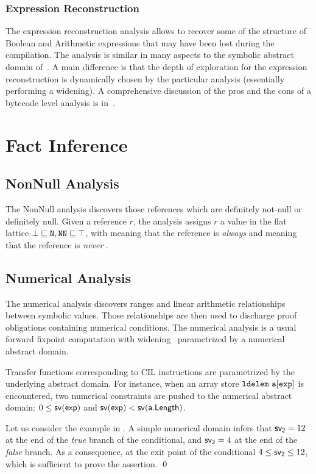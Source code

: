 \documentclass{llncs}
\begin{document}
\subsubsection{Expression Reconstruction}
The expression reconstruction analysis allows to recover some of the structure of Boolean and Arithmetic expressions that may have been lost during the compilation.
The analysis is similar in many aspects to the symbolic abstract domain of~\cite{Mine06}.
A main difference is that the depth of exploration for the expression reconstruction is dynamically chosen by the  particular analysis (essentially performing a widening).  
A comprehensive discussion of the pros and the cons of a bytecode level analysis is in~\cite{LogozzoMaf08}.

\section{Fact Inference}

\subsection{NonNull Analysis}
The NonNull analysis  discovers those references which are definitely not-null or definitely null.
Given a reference $r$, the analysis assigns $r$ a value in the flat lattice $\bot \sqsubseteq \mathtt{N}, \mathtt{NN} \sqsubseteq \top$, with  meaning that the reference is \emph{always}  and  meaning that the reference is \emph{never} .

\subsection{Numerical Analysis}
The numerical analysis discovers ranges and linear arithmetic relationships between symbolic values.
Those relationships are then  used to discharge proof obligations containing numerical conditions.
The numerical analysis is a usual forward fixpoint computation with widening~\cite{CousotCousot-92} parametrized by a numerical abstract domain.

Transfer functions corresponding to CIL instructions are parametrized by the underlying abstract domain.
For instance, when an array store $\mathtt{ldelem\ a[exp]}$ is encountered, two numerical constraints are pushed to the  numerical abstract domain: $0 \leq \mathsf{sv(exp)}$ and $\mathsf{sv(exp)} < \mathsf{sv(a.Length)}$.
\begin{example}
Let us consider the example in .
A simple numerical domain infers that $\mathsf{sv_{2}} = 12$ at the end of the \emph{true} branch of the conditional, and $\mathsf{sv_{2}} = 4$ at the end of the \emph{false} branch.  
As a consequence, at the exit point of the conditional $4 \leq \mathsf{sv_{2}} \leq 12$, which is sufficient to prove the assertion. \qed
\end{example}
\end{document}
